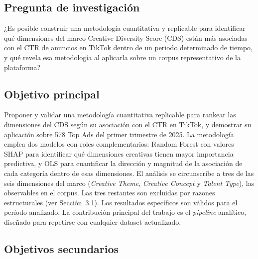 \documentclass[12pt, a4paper]{report}
\begin{document}
\subsection{Pregunta de investigación}

¿Es posible construir una metodología cuantitativa y replicable para identificar qué
dimensiones del marco Creative Diversity Score (CDS) están más asociadas con el CTR
de anuncios en TikTok dentro de un periodo determinado de tiempo, 
y qué revela esa metodología al aplicarla sobre un corpus representativo de la plataforma?

\subsection{Objetivo principal}

Proponer y validar una metodología cuantitativa replicable para rankear las dimensiones
del CDS según su asociación con el CTR en TikTok, y demostrar su aplicación sobre 578
Top Ads del primer trimestre de 2025. La metodología emplea dos modelos con roles
complementarios: Random Forest con valores SHAP para identificar qué dimensiones
creativas tienen mayor importancia predictiva, y OLS para cuantificar la dirección y
magnitud de la asociación de cada categoría dentro de esas dimensiones. El análisis se circunscribe a tres de las seis dimensiones
del marco (\textit{Creative Theme}, \textit{Creative Concept} y \textit{Talent Type}),
las observables en el corpus. Las tres restantes son
excluidas por razones estructurales (ver Sección~3.1). Los resultados específicos son
válidos para el período analizado. La contribución principal del trabajo es el
\textit{pipeline} analítico, diseñado para repetirse con cualquier dataset actualizado.

\subsection{Objetivos secundarios}
\end{document}
